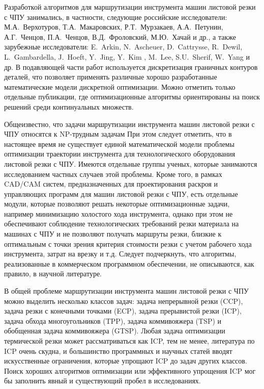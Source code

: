 Разработкой алгоритмов для маршрутизации инструмента машин листовой резки с ЧПУ занимались,
в частности, следующие российские исследователи:
М.А.~Верхотуров, Т.А.~Макаровских, Р.Т.~Мурзакаев, А.А.~Петунин, А.Г.~Ченцов,
П.А.~Ченцов, В.Д.~Фроловский, М.Ю.~Хачай и др.,
а также зарубежные исследователи:
E.~Arkin, N.~Ascheuer, D.~Cattrysse, R.~Dewil, L.~Gambardella, J.~Hoeft, Y.~Jing, Y.~Kim , M.~Lee, S.U.~Sherif, W.~Yang и др.
В подавляющей части работ
используется дискретизация граничных контуров деталей,
что позволяет применять различные хорошо разработанные математические модели дискретной оптимизации.
Можно отметить только отдельные публикации,
где оптимизационные алгоритмы ориентированы на поиск решений среди континуальных множеств.

Общеизвестно,
что задачи маршрутизации инструмента машин листовой резки с ЧПУ относятся к
NP-трудным задачам
При этом следует отметить, что в настоящее время не существует единой математической модели
проблемы оптимизации траектории инструмента для технологического оборудования листовой резки с ЧПУ.
Имеются отдельные группы ученых, которые занимаются исследованием частных случаев этой проблемы.
Кроме того, в рамках CAD/CAM систем,
предназначенных для проектирования раскроя и управляющих программ для машин листовой резки с ЧПУ,
есть отдельные модули, которые позволяют решать некоторые оптимизационные задачи,
например минимизацию холостого хода инструмента,
однако при этом не обеспечивают соблюдение технологических требований резки материала на машинах с ЧПУ
и не позволяют получать маршруты резки,
близкие к оптимальным с точки зрения критерия стоимости резки с учетом рабочего хода инструмента,
затрат на врезку и т.д.
Следует подчеркнуть,
что алгоритмы, реализованные в коммерческом программном обеспечении,
не описываются, как правило, в научной литературе.

В общей проблеме маршрутизации инструмента машин листовой резки с ЧПУ
можно выделить несколько классов задач:
задача непрерывной резки (CCP),
задача резки с конечными точками (ECP),
задача прерывистой резки (ICP),
задача обхода многоугольников (TPP),
задача коммивояжера (TSP)
и обобщенная задача коммивояжера (GTSP).
Любая задача оптимизации термической резки может рассматриваться как ICP,
тем не менее, литература по ICP очень скудна,
и большинство программных и научных статей вводят искусственные ограничения,
которые упрощают ICP до задач других классов.
Поиск хороших алгоритмов оптимизации или эффективного упрощения ICP
мог бы заполнить явный и существующий пробел в исследованиях.

